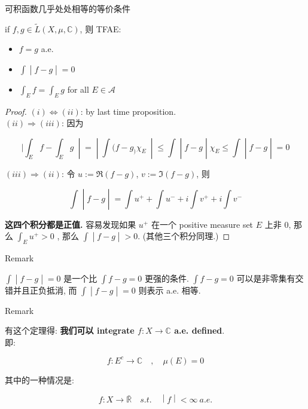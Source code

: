 \documentclass{qlnotes-export}
\begin{document}
\begin{proposition}{可积函数几乎处处相等的等价条件}

if \(f,g \in \widetilde{L}(X,\mu,{\mathbb{C}})\), 则 TFAE:

\begin{itemize}
\item
  \(f = g\) a.e.
\item
  \(\left. \int \middle| f - g \middle| = 0 \right.\)
\item
  \(\int_{E}f = \int_{E}g\) for all \(E \in \mathcal{A}\)
\end{itemize}

\end{proposition}

\begin{proof}

\((i)\Leftrightarrow(ii)\): by last time proposition.\\
\((ii)\Longrightarrow(iii)\): 因为

\[\left. |\int_{E}f - \int_{E}g\  \middle| = \middle| \int(f - g_{)}\chi_{E}\  \middle| \leq \int \middle| f - g \middle| \chi_{E} \leq \int \middle| f - g \middle| = 0 \right.\]

\((iii)\Longrightarrow(ii)\): 令 \(u := \Re(f - g)\), \(v := \Im(f - g)\), 则

\[\left. \int \middle| f - g \middle| = \int u^{+} + \int u^{-} + i\int v^{+} + i\int v^{-} \right.\]

\textbf{这四个积分都是正值.} 容易发现如果 \(u^{+}\) 在一个 positive measure set \(E\) 上非 0, 那么 \(\int_{E}u^{+} > 0\) , 那么 \(\left. \int \middle| f - g \middle| > 0 \right.\). (其他三个积分同理.)

\end{proof}

\begin{qlremark}{Remark}

\(\left. \int \middle| f - g \middle| = 0 \right.\) 是一个比 \(\int f - g = 0\) 更强的条件. \(\int f - g = 0\) 可以是非零集有交错并且正负抵消, 而 \(\left. \int \middle| f - g \middle| = 0 \right.\) 则表示 a.e. 相等.

\end{qlremark}

\begin{qlremark}{Remark}

有这个定理得: \textbf{我们可以 integrate \(f:X\rightarrow{\mathbb{C}}\) a.e. defined}.\\
即:

\[f:E^{c}\rightarrow{\mathbb{C}}\quad,\quad\mu(E) = 0\]

其中的一种情况是:

\[\left. f:X\rightarrow\bar{\mathbb{R}}\quad s.t.\quad \middle| f \middle| < \infty\ a.e. \right.\]

\end{qlremark}
\end{document}

